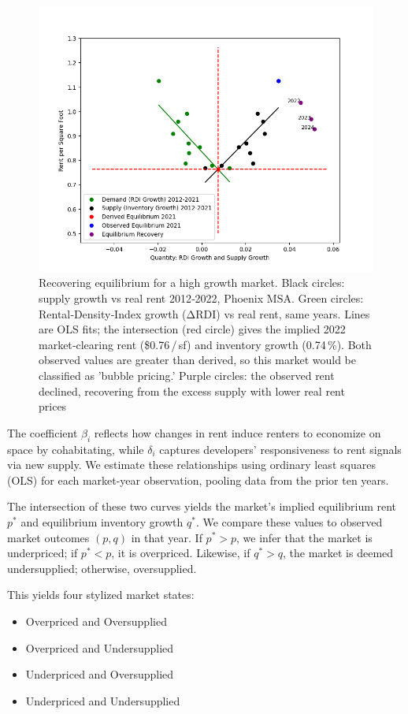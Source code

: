 \documentclass[APA,Times1COL]{WileyNJDv5} %
\begin{document}
\begin{figure}[t]
	\centering
	\includegraphics[width=0.95\linewidth]{phoenix_example.png}
	\caption{Recovering equilibrium for a high growth market.  
		Black circles: supply growth vs real rent 2012‑2022, Phoenix MSA.  
		Green circles: Rental‑Density‑Index growth (ΔRDI) vs real rent, same years.  
		Lines are OLS fits; the intersection (red circle) gives the implied 2022 market‑clearing rent (\$0.76 / sf)  
		and inventory growth (0.74 \%). Both observed values are greater than derived, so this market would be classified as 'bubble pricing.' 
		Purple circles: the observed rent declined, recovering from the excess supply with lower real rent prices}
	\label{fig:phoenix_mechanism}
\end{figure}

The coefficient \( \beta_i \) reflects how changes in rent induce renters to economize on space by cohabitating, while \( \delta_i \) captures developers' responsiveness to rent signals via new supply. We estimate these relationships using ordinary least squares (OLS) for each market-year observation, pooling data from the prior ten years.

The intersection of these two curves yields the market's implied equilibrium rent \( p^* \) and equilibrium inventory growth \( q^* \). We compare these values to observed market outcomes \( (p, q) \) in that year. If \( p^* > p \), we infer that the market is underpriced; if \( p^* < p \), it is overpriced. Likewise, if \( q^* > q \), the market is deemed undersupplied; otherwise, oversupplied.

This yields four stylized market states:
\begin{itemize}
\item Overpriced and Oversupplied
\item Overpriced and Undersupplied
\item Underpriced and Oversupplied
\item Underpriced and Undersupplied
\end{itemize}
\end{document}
